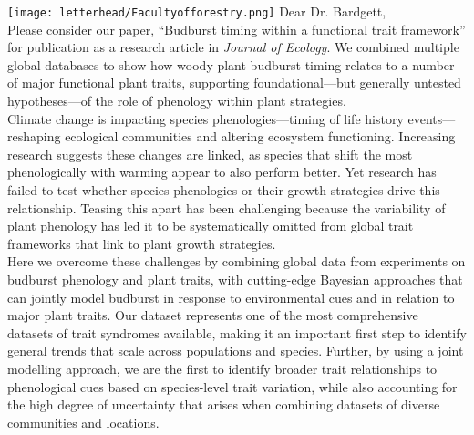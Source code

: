 \documentclass[11pt,a4paper]{article}
\begin{document}
\noindent \texttt{[image: letterhead/Facultyofforestry.png]}
\noindent Dear Dr. Bardgett,
\vspace{1.5ex}\\
\noindent Please consider our paper, ``Budburst timing within a functional trait framework'' for publication as a research article in \emph{Journal of Ecology}. We combined multiple global databases to show how woody plant budburst timing relates to a number of major functional plant traits, supporting foundational---but generally untested hypotheses---of the role of phenology within plant strategies. 
\vspace{1.5ex}\\ 
\noindent Climate change is impacting species phenologies---timing of life history events---reshaping ecological communities and altering ecosystem functioning. Increasing research suggests these changes are linked, as species that shift the most phenologically with warming appear to also perform better. Yet research has failed to test whether species phenologies or their growth strategies drive this relationship. Teasing this apart has been challenging because the variability of plant phenology has led it to be systematically omitted from global trait frameworks that link to plant growth strategies. %
\vspace{1.5ex}\\
Here we overcome these challenges by combining global data from experiments on budburst phenology and plant traits, with cutting-edge Bayesian approaches that can jointly model budburst in response to environmental cues and in relation to major plant traits. Our dataset represents one of the most comprehensive datasets of trait syndromes available, making it an important first step to identify general trends that scale across populations and species. Further, by using a joint modelling approach, we are the first to identify broader trait relationships to phenological cues based on species-level trait variation, while also accounting for the high degree of uncertainty that arises when combining datasets of diverse communities and locations.
\end{document}

